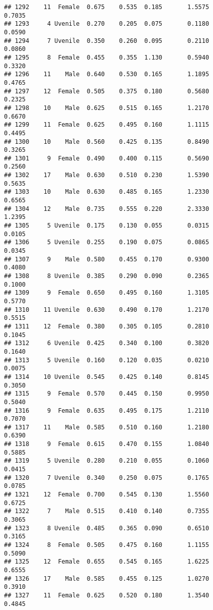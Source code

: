 \documentclass[
]{article}
\begin{document}
\begin{verbatim}
## 1292    11  Female  0.675    0.535  0.185       1.5575         0.7035
## 1293     4 Uvenile  0.270    0.205  0.075       0.1180         0.0590
## 1294     7 Uvenile  0.350    0.260  0.095       0.2110         0.0860
## 1295     8  Female  0.455    0.355  1.130       0.5940         0.3320
## 1296    11    Male  0.640    0.530  0.165       1.1895         0.4765
## 1297    12  Female  0.505    0.375  0.180       0.5680         0.2325
## 1298    10    Male  0.625    0.515  0.165       1.2170         0.6670
## 1299    11  Female  0.625    0.495  0.160       1.1115         0.4495
## 1300    10    Male  0.560    0.425  0.135       0.8490         0.3265
## 1301     9  Female  0.490    0.400  0.115       0.5690         0.2560
## 1302    17    Male  0.630    0.510  0.230       1.5390         0.5635
## 1303    10    Male  0.630    0.485  0.165       1.2330         0.6565
## 1304    12    Male  0.735    0.555  0.220       2.3330         1.2395
## 1305     5 Uvenile  0.175    0.130  0.055       0.0315         0.0105
## 1306     5 Uvenile  0.255    0.190  0.075       0.0865         0.0345
## 1307     9    Male  0.580    0.455  0.170       0.9300         0.4080
## 1308     8 Uvenile  0.385    0.290  0.090       0.2365         0.1000
## 1309     9  Female  0.650    0.495  0.160       1.3105         0.5770
## 1310    11 Uvenile  0.630    0.490  0.170       1.2170         0.5515
## 1311    12  Female  0.380    0.305  0.105       0.2810         0.1045
## 1312     6 Uvenile  0.425    0.340  0.100       0.3820         0.1640
## 1313     5 Uvenile  0.160    0.120  0.035       0.0210         0.0075
## 1314    10 Uvenile  0.545    0.425  0.140       0.8145         0.3050
## 1315     9  Female  0.570    0.445  0.150       0.9950         0.5040
## 1316     9  Female  0.635    0.495  0.175       1.2110         0.7070
## 1317    11    Male  0.585    0.510  0.160       1.2180         0.6390
## 1318     9  Female  0.615    0.470  0.155       1.0840         0.5885
## 1319     5 Uvenile  0.280    0.210  0.055       0.1060         0.0415
## 1320     7 Uvenile  0.340    0.250  0.075       0.1765         0.0785
## 1321    12  Female  0.700    0.545  0.130       1.5560         0.6725
## 1322     7    Male  0.515    0.410  0.140       0.7355         0.3065
## 1323     8 Uvenile  0.485    0.365  0.090       0.6510         0.3165
## 1324     8  Female  0.505    0.475  0.160       1.1155         0.5090
## 1325    12  Female  0.655    0.545  0.165       1.6225         0.6555
## 1326    17    Male  0.585    0.455  0.125       1.0270         0.3910
## 1327    11  Female  0.625    0.520  0.180       1.3540         0.4845

\end{verbatim}
\end{document}
